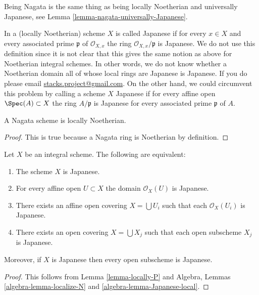 \noindent
Being Nagata is the same thing as being locally Noetherian
and universally Japanese, see
Lemma \ref{lemma-nagata-universally-Japanese}.

\begin{remark}
\label{remark-non-integral-Japanese}
In \cite{Hoobler-finite} a (locally Noetherian) scheme $X$ is called
Japanese if for every $x \in X$ and every associated prime $\mathfrak p$
of $\mathcal{O}_{X, x}$ the ring $\mathcal{O}_{X, x}/\mathfrak p$ is
Japanese. We do not use this definition since it is not clear
that this gives the same notion as above for Noetherian integral schemes.
In other words, we do not know whether a Noetherian domain all
of whose local rings are Japanese is Japanese. If you do please
email \href{mailto:stacks.project@gmail.com}{stacks.project@gmail.com}.
On the other hand, we could circumvent this problem by calling a scheme
$X$ Japanese if for every affine open $\Spec(A) \subset X$ the ring
$A/\mathfrak p$ is Japanese for every associated prime $\mathfrak p$ of $A$.
\end{remark}

\begin{lemma}
\label{lemma-nagata-locally-Noetherian}
A Nagata scheme is locally Noetherian.
\end{lemma}

\begin{proof}
This is true because a Nagata ring is Noetherian by definition.
\end{proof}

\begin{lemma}
\label{lemma-locally-Japanese}
Let $X$ be an integral scheme. The following are equivalent:
\begin{enumerate}
\item The scheme $X$ is Japanese.
\item For every affine open $U \subset X$ the domain $\mathcal{O}_X(U)$
is Japanese.
\item There exists an affine open covering $X = \bigcup U_i$
such that each $\mathcal{O}_X(U_i)$ is Japanese.
\item There exists an open covering $X = \bigcup X_j$
such that each open subscheme $X_j$ is Japanese.
\end{enumerate}
Moreover, if $X$ is Japanese then every open subscheme
is Japanese.
\end{lemma}

\begin{proof}
This follows from Lemma \ref{lemma-locally-P} and
Algebra, Lemmas \ref{algebra-lemma-localize-N} and
\ref{algebra-lemma-Japanese-local}.
\end{proof}

